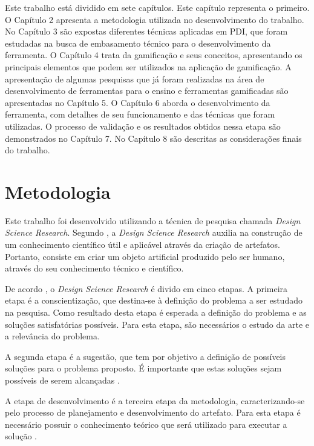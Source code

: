 \documentclass[
	12pt,				%
	oneside,			%
	a4paper,			%
	english,			%
	french,				%
	spanish,			%
	brazil,				%
	]{abntex2}
\begin{document}
Este trabalho está dividido em sete capítulos. Este capítulo representa o primeiro. O Capítulo 2 apresenta a metodologia utilizada no desenvolvimento do trabalho. No Capítulo 3 são expostas diferentes técnicas aplicadas em PDI, que foram estudadas na busca de embasamento técnico para o desenvolvimento da ferramenta. O Capítulo 4 trata da gamificação e seus conceitos, apresentando os principais elementos que podem ser utilizados na aplicação de gamificação. A apresentação de algumas pesquisas que já foram realizadas na área de desenvolvimento de ferramentas para o ensino e ferramentas gamificadas são apresentadas no Capítulo 5. O Capítulo 6 aborda o desenvolvimento da ferramenta, com detalhes de seu funcionamento e das técnicas que foram utilizadas. O processo de validação e os resultados obtidos nessa etapa são demonstrados no Capítulo 7. No Capítulo 8 são descritas as considerações finais do trabalho.

\chapter{Metodologia}

Este trabalho foi desenvolvido utilizando a técnica de pesquisa chamada \textit{Design Science Research}. Segundo \citet{dresch:2015}, a \textit{Design
Science Research} auxilia na construção de um conhecimento científico útil e aplicável através da criação de artefatos. Portanto, consiste em criar um objeto artificial produzido pelo ser humano, através do seu conhecimento técnico e científico.

De acordo \citet{dresch:2015}, o \textit{Design
Science Research} é divido em cinco etapas. A primeira etapa é a conscientização, que destina-se à definição do problema a ser estudado na pesquisa. Como resultado desta etapa é esperada a definição do problema e as soluções satisfatórias possíveis. Para esta etapa, são necessários o estudo da arte e a relevância do problema.

A segunda etapa é a sugestão, que tem por objetivo a definição de possíveis soluções para o problema proposto. É importante que estas soluções sejam possíveis de serem alcançadas \cite{dresch:2015}.

A etapa de desenvolvimento é a terceira etapa da metodologia, caracterizando-se pelo processo de planejamento e desenvolvimento do artefato. Para esta etapa é necessário possuir o conhecimento teórico que será utilizado para executar a solução \cite{dresch:2015}.
\end{document}
